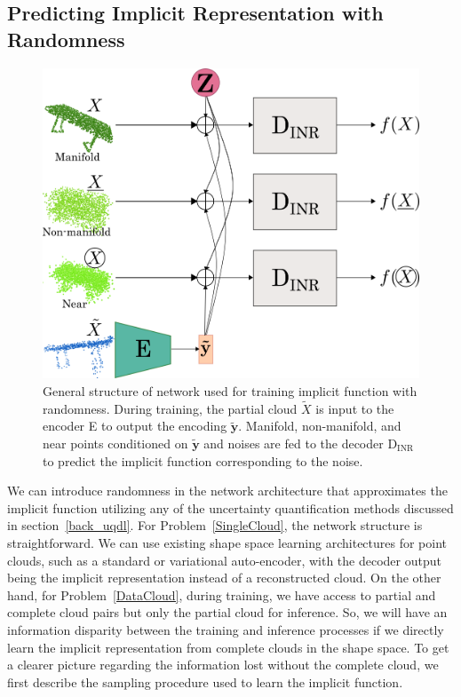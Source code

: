     \subsection{Predicting Implicit Representation with Randomness}
    \begin{figure}[htb]
      \begin{center}
      \includegraphics[width=\linewidth]{figures/inr_network.png}
      \end{center}
      \caption{General structure of network used for training implicit function with randomness. During training, the partial cloud $\tilde{X}$ is input to the encoder E to output the encoding $\mathbf{\tilde{y}}$. Manifold, non-manifold, and near points conditioned on $\mathbf{\tilde{y}}$ and noises are fed to the decoder D$_{\text{INR}}$ to predict the implicit function corresponding to the noise.}\label{fig:inr_net}
    \end{figure}
    We can introduce randomness in the network architecture that approximates the implicit function utilizing any of the uncertainty quantification methods discussed in section~\ref{back_uqdl}. For Problem~\ref{SingleCloud}, the network structure is straightforward. We can use existing shape space learning architectures for point clouds, such as a standard or variational auto-encoder, with the decoder output being the implicit representation instead of a reconstructed cloud. On the other hand, for Problem~\ref{DataCloud}, during training, we have access to partial and complete cloud pairs but only the partial cloud for inference. So, we will have an information disparity between the training and inference processes if we directly learn the implicit representation from complete clouds in the shape space. To get a clearer picture regarding the information lost without the complete cloud, we first describe the sampling procedure used to learn the implicit function.
    \newline
    

